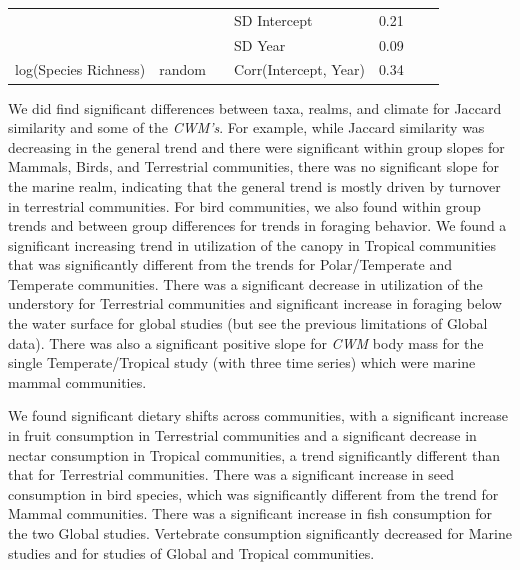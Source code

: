 \documentclass{article}
\begin{document}
\begin{table}[!h]
{\begin{tabular}[t]{l|l|>{\raggedright\arraybackslash}p{2cm}|l|r|r|l}
\cline{3-7}
 &  &  & SD Intercept & 0.21 &  & \\
\cline{4-7}
 &  &  & SD Year & 0.09 &  & \\
\cline{4-7}
\multirow{-8}{*}{\raggedright\arraybackslash log(Species Richness)} & \multirow{-6}{*}{\raggedright\arraybackslash random} & \multirow{-3}{2cm}{\raggedright\arraybackslash time series within study} & Corr(Intercept, Year) & 0.34 &  & \\
\hline
\end{tabular}}
\end{table}

We did find significant differences between taxa, realms, and climate
for Jaccard similarity and some of the \emph{CWM's}. For example, while
Jaccard similarity was decreasing in the general trend and there were
significant within group slopes for Mammals, Birds, and Terrestrial
communities, there was no significant slope for the marine realm,
indicating that the general trend is mostly driven by turnover in
terrestrial communities. For bird communities, we also found within
group trends and between group differences for trends in foraging
behavior. We found a significant increasing trend in utilization of the
canopy in Tropical communities that was significantly different from the
trends for Polar/Temperate and Temperate communities. There was a
significant decrease in utilization of the understory for Terrestrial
communities and significant increase in foraging below the water surface
for global studies (but see the previous limitations of Global data).
There was also a significant positive slope for \emph{CWM} body mass for
the single Temperate/Tropical study (with three time series) which were
marine mammal communities.

We found significant dietary shifts across communities, with a
significant increase in fruit consumption in Terrestrial communities and
a significant decrease in nectar consumption in Tropical communities, a
trend significantly different than that for Terrestrial communities.
There was a significant increase in seed consumption in bird species,
which was significantly different from the trend for Mammal communities.
There was a significant increase in fish consumption for the two Global
studies. Vertebrate consumption significantly decreased for Marine
studies and for studies of Global and Tropical communities.
\end{document}
